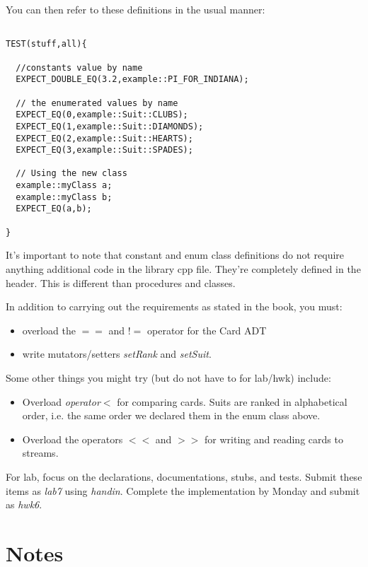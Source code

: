 \documentclass[10pt]{article}
\begin{document}
You can then refer to these definitions in the usual manner:
\begin{verbatim}

TEST(stuff,all){

  //constants value by name
  EXPECT_DOUBLE_EQ(3.2,example::PI_FOR_INDIANA);

  // the enumerated values by name  
  EXPECT_EQ(0,example::Suit::CLUBS);
  EXPECT_EQ(1,example::Suit::DIAMONDS);
  EXPECT_EQ(2,example::Suit::HEARTS);
  EXPECT_EQ(3,example::Suit::SPADES);   

  // Using the new class	
  example::myClass a;
  example::myClass b;
  EXPECT_EQ(a,b);	
  
}
\end{verbatim}
It's important to note that constant and enum class definitions do not require anything additional code in the library cpp file. They're completely defined in the header.  This is different than procedures and classes.

In addition to carrying out the requirements as stated in the book, you must:
\begin{itemize}
\item overload the $==$ and $!=$ operator for the Card ADT
\item write mutators/setters \textit{setRank} and \textit{setSuit}. 
\end{itemize}

Some other things you might try (but do not have to for lab/hwk) include:
\begin{itemize}
\item Overload \textit{operator$<$} for comparing cards. Suits are ranked in alphabetical order, i.e. the same order we declared them in the enum class above.
\item Overload the operators $<<$ and $>>$ for writing and reading cards to streams. 
\end{itemize}

For lab, focus on the declarations, documentations, stubs, and tests. Submit these items as \textit{lab7} using \textit{handin}. Complete the implementation by Monday and submit as \textit{hwk6}.

\section{Notes}
\end{document}
